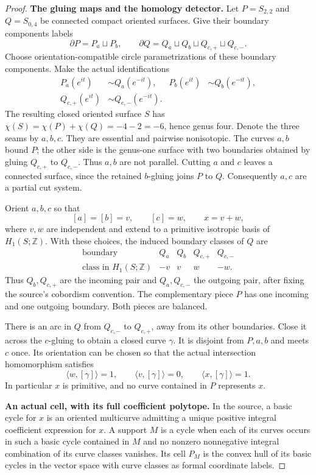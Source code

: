 \begin{proof}
\medskip\noindent\textbf{The gluing maps and the homology detector.}
Let $P=S_{2,2}$ and $Q=S_{0,4}$ be connected compact oriented
surfaces.  Give their boundary components labels
\[
 \partial P=P_a\sqcup P_b,\qquad
 \partial Q=Q_a\sqcup Q_b\sqcup Q_{c,+}\sqcup Q_{c,-}.
 \tag{D.601}
\]
Choose orientation-compatible circle parametrizations of
these boundary components.  Make the actual identifications
\[
 \begin{aligned}
 P_a(e^{it})&\sim Q_a(e^{-it}),&
 P_b(e^{it})&\sim Q_b(e^{-it}),\\
 Q_{c,+}(e^{it})&\sim Q_{c,-}(e^{-it}).
 \end{aligned}
 \tag{D.602}
\]
The resulting closed oriented surface $S$ has
$\chi(S)=\chi(P)+\chi(Q)=-4-2=-6$, hence genus four.
Denote the three seams by $a,b,c$.  They are essential
and pairwise nonisotopic.  The curves $a,b$ bound $P$;
the other side is the genus-one surface with two boundaries
obtained by gluing $Q_{c,+}$ to $Q_{c,-}$.
Thus $a,b$ are not parallel.  Cutting $a$ and $c$ leaves
a connected surface, since the retained $b$-gluing joins
$P$ to $Q$.  Consequently $a,c$ are a partial cut system.

Orient $a,b,c$ so that
\[
 [a]=[b]=v,\qquad [c]=w,\qquad x=v+w,
 \tag{D.603}
\]
where $v,w$ are independent and extend to a primitive
isotropic basis of $H_1(S;\mathbb Z)$.
With these choices, the induced boundary classes of $Q$ are
\[
 \begin{array}{c|rrrr}
 \text{boundary}&Q_a&Q_b&Q_{c,+}&Q_{c,-}\\ \hline
 \text{class in }H_1(S;\mathbb Z)&-v&v&w&-w .
 \end{array}
 \tag{D.604}
\]
Thus $Q_b,Q_{c,+}$ are the incoming pair and
$Q_a,Q_{c,-}$ the outgoing pair, after fixing the
source's cobordism convention.  The complementary
piece $P$ has one incoming and one outgoing boundary.
Both pieces are balanced.

There is an arc in $Q$ from $Q_{c,-}$ to $Q_{c,+}$,
away from its other boundaries.  Close it across the
$c$-gluing to obtain a closed curve $\gamma$.
It is disjoint from $P,a,b$ and meets $c$ once.
Its orientation can be chosen so that the actual
intersection homomorphism satisfies
\[
 \langle w,[\gamma]\rangle=1,\qquad
 \langle v,[\gamma]\rangle=0,\qquad
 \langle x,[\gamma]\rangle=1.
 \tag{D.605}
\]
In particular $x$ is primitive, and no curve contained
in $P$ represents $x$.

\medskip\noindent\textbf{An actual cell, with its full coefficient polytope.}
In the source, a basic cycle for $x$ is an oriented
multicurve admitting a unique positive integral
coefficient expression for $x$.
A support $M$ is a cycle when each of its curves occurs
in such a basic cycle contained in $M$ and no nonzero
nonnegative integral combination of its curve classes
vanishes.  Its cell $P_M$ is the convex hull of its
basic cycles in the vector space with curve classes
as formal coordinate labels.


\end{proof}
